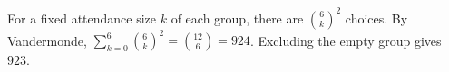 For a fixed attendance size $k$ of each group, there are $\binom 6k^2$ choices. By Vandermonde, $\sum_{k=0}^6\binom 6k^2=\binom{12}{6}=924$. Excluding the empty group gives $\boxed{923}$.
